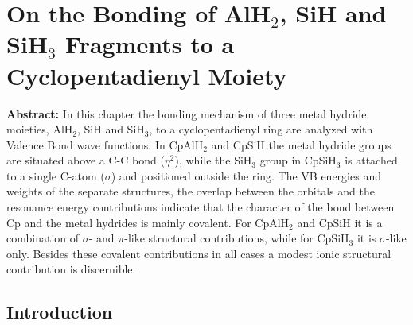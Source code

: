 \chapter{On the Bonding of AlH$_2$, SiH and SiH$_3$ Fragments to a Cyclopentadienyl Moiety}
\label{chap_cyclopentadienyl}


\noindent\textbf{Abstract:} In this chapter the bonding mechanism of three metal hydride moieties, AlH$_2$, SiH and SiH$_3$, to a cyclopentadienyl ring are analyzed with Valence Bond wave functions. In CpAlH$_2$ and CpSiH the metal hydride groups are situated above a C-C bond ($\eta^2$), while the SiH$_3$ group in CpSiH$_3$ is attached to a single C-atom ($\sigma$) and positioned outside the ring. The VB energies and weights of the separate structures, the overlap between the orbitals and the resonance energy contributions indicate that the character of the bond between Cp and the metal hydrides is mainly covalent. For CpAlH$_2$ and CpSiH it is a combination of $\sigma$- and $\pi$-like structural contributions, while for CpSiH$_3$ it is $\sigma$-like only. Besides these covalent contributions in all cases a modest ionic structural contribution is discernible.

\clearpage

\section{Introduction}

